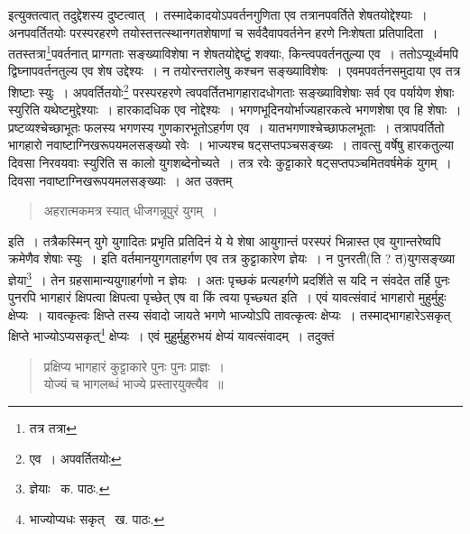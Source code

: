 \documentclass[11pt, openany]{book}
\begin{document}
\newpage

\noindent इत्युक्तत्वात् तदुद्देशस्य दुष्टत्वात्~। तस्मादेकादयोऽपवर्तनगुणिता एव तत्रानपवर्तिते शेषतयोद्देश्याः~। अनपवर्तितयोः परस्परहरणे
तयोस्तत्तत्स्थानगतशेषाणां च सर्वदैवापवर्तनेन हरणे निःशेषता प्रतिपादिता~। ततस्तत्रा\renewcommand{\thefootnote}{१}\footnote{तत्र तत्रा}पवर्तनात् प्राग्गताः सङ्ख्याविशेषा न शेषतयोद्देष्टुं शक्याः,
किन्त्वपवर्तनतुल्या एव~। ततोऽप्यूर्ध्वमपि द्विघ्नापवर्तनतुल्य एव शेष उद्देश्यः~। न तयोरन्तरालेषु कश्चन सङ्ख्याविशेषः~। एवमपवर्तनसमुदाया एव तत्र शिष्टाः स्युः~। अपवर्तितयोः\renewcommand{\thefootnote}{२}\footnote{एव~। अपवर्तितयोः} परस्परहरणे त्वपवर्तितभागहारादधोगताः सङ्ख्याविशेषाः सर्व एव पर्यायेण शेषाः स्युरिति यथेष्टमुद्देश्याः~। हारकादधिक एव नोद्देश्यः~। भगणभूदिनयोर्भाज्यहारकत्वे भगणशेषा एव हि शेषाः~। प्रष्टव्यश्चेच्छाभूतः फलस्य भगणस्य गुणकारभूतोऽहर्गण एव~। यातभगणाश्चेच्छाफलभूताः~। तत्रापवर्तितो भागहारो नवाष्टाग्निखरूपयमलसङ्ख्यो रवेः~। भाज्यश्च षट्सप्तपञ्चसङ्ख्यः~। तावत्सु वर्षेषु हारकतुल्या दिवसा निरवयवाः स्युरिति स कालो युगशब्देनोच्यते~। तत्र रवेः कुट्टाकारे षट्सप्तपञ्चमितवर्षमेकं युगम्~। दिवसा नवाष्टाग्निखरूपयमलसङ्ख्याः~। अत उक्तम्\textendash

\begin{quote}
{\qt अहरात्मकमत्र स्यात् धीजगन्नूपुरं युगम्~।}
\end{quote}

\noindent इति~। तत्रैकस्मिन् युगे युगादितः प्रभृति प्रतिदिनं ये ये शेषा आयुगान्तं परस्परं भिन्नास्त एव युगान्तरेष्वपि क्रमेणैव शेषाः स्युः~। इति वर्तमानयुगगताहर्गण एव तत्र कुट्टाकारेण ज्ञेयः~। न पुनरती(ति ? त)युगसङ्ख्या ज्ञेया\renewcommand{\thefootnote}{३}\footnote{ज्ञेयाः \textendash\ क. पाठः.}~। तेन ग्रहसामान्ययुगाहर्गणो न ज्ञेयः~। अतः पृच्छकं प्रत्यहर्गणे प्रदर्शिते स यदि न संवदेत तर्हि पुनः पुनरपि भागहारं क्षिपत्वा क्षिपत्वा पृच्छेत् एष वा किं त्वया पृच्छ्यत इति~। एवं यावत्संवादं भागहारो मुहुर्मुहुः क्षेप्यः~। यावत्कृत्वः क्षिप्ते तस्य संवादो जायते भगणे भाज्योऽपि तावत्कृत्वः क्षेप्यः~। तस्माद्भागहारेऽसकृत् क्षिप्ते भाज्योऽप्यसकृत्\renewcommand{\thefootnote}{४}\footnote{भाज्योप्यधः सकृत् \textendash\ ख. पाठः.} क्षेप्यः~। एवं मुहुर्मुहुरुभयं क्षेप्यं यावत्संवादम्~। तदुक्तं\textendash

\begin{quote}
{\qt प्रक्षिप्य भागहारं कुट्टाकारे पुनः पुनः प्राज्ञः~।\\
योज्यं च भागलब्धं भाज्ये प्रस्तारयुक्त्यैव~॥}
\end{quote}

\newpage
\end{document}
